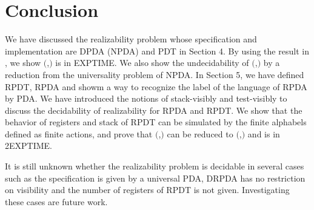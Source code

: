 \section{Conclusion}
We have discussed the realizability problem
whose specification and implementation are
DPDA (NPDA) and PDT in Section 4.
By using the result in \cite{Wa96},
we show \Real$($\DPDA,\PDT$)$ is in EXPTIME.
We also show the undecidability of \Real$($\NPDA,\PDT$)$
by a reduction from the universality problem of NPDA.
In Section 5, we have defined RPDT, RPDA and
showm a way to recognize the label of the language of RPDA by PDA.
We have introduced the notions of stack-visibly \cite{AM04} and
test-visibly to discuss the decidability of realizability
for RPDA and RPDT.
We show that the behavior of registers and stack of RPDT
can be simulated by the finite alphabels defined as finite actions,
and prove that \Real$($\DRPDAv,\RPDTk$)$ can be reduced to \Real$($\DPDA,\PDT$)$ and is in 2EXPTIME.

It is still unknown whether the realizability problem is decidable
in several cases such as
the specification is given by a universal PDA,
DRPDA has no restriction on visibility and
the number of registers of RPDT is not given.
Investigating these cases are future work.
